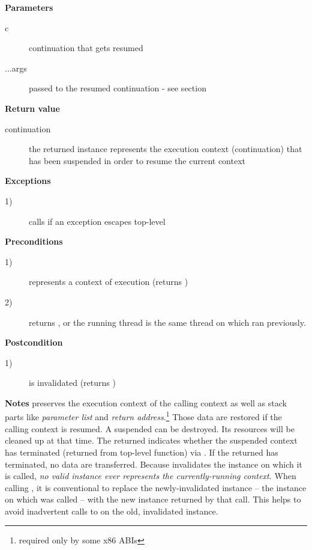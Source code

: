 {\bfseries Parameters}
\begin{description}
    \item[c]       continuation that gets resumed
    \item[...args] passed to the resumed continuation - see section
                   \\
\end{description}

{\bfseries Return value}
\begin{description}
    \item[continuation] the returned instance represents the execution context
                        (continuation) that has been suspended in order to
                        resume the current context
\end{description}

{\bfseries Exceptions}
\begin{description}
    \item[1)] calls  if an exception escapes top-level
              \\
\end{description}

{\bfseries Preconditions}
\begin{description}
    \item[1)]  represents a context of execution (\opbool returns
               )
    \item[2)]  returns , or the running thread is
              the same thread on which  ran previously.
\end{description}

{\bfseries Postcondition}
\begin{description}
    \item[1)]  is invalidated (\opbool returns )
\end{description}

{\bfseries Notes}
\newline
\resume preserves the execution context of the calling context as well as stack
parts like \emph{parameter list} and \emph{return address}.\footnote{required
only by some x86 ABIs} Those data are restored if the calling context is
resumed.
\newline
A suspended  can be destroyed. Its resources will be cleaned
up at that time.
\newline
The returned  indicates whether the suspended context
has terminated (returned from top-level function) via \opbool. If the returned
 has terminated, no data are transferred.
\newline
Because \resume invalidates the instance on which it is called, \emph{no valid
\cont instance ever represents the currently-running context.}
\newline
When calling \resume, it is conventional to replace the newly-invalidated
instance -- the instance on which \resume was called -- with the new instance
returned by that \resume call. This helps to avoid inadvertent calls to \resume
on the old, invalidated instance.


